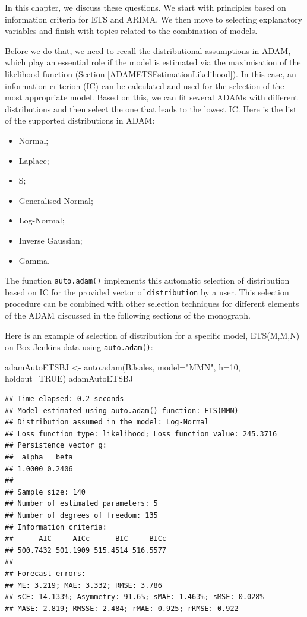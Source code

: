 \documentclass[
]{book}
\newenvironment{Shaded}{\begin{snugshade}}{\end{snugshade}}
\newcommand{\AttributeTok}[1]{\textcolor[rgb]{0.77,0.63,0.00}{#1}}
\newcommand{\ConstantTok}[1]{\textcolor[rgb]{0.00,0.00,0.00}{#1}}
\newcommand{\DecValTok}[1]{\textcolor[rgb]{0.00,0.00,0.81}{#1}}
\newcommand{\FunctionTok}[1]{\textcolor[rgb]{0.00,0.00,0.00}{#1}}
\newcommand{\NormalTok}[1]{#1}
\newcommand{\OtherTok}[1]{\textcolor[rgb]{0.56,0.35,0.01}{#1}}
\newcommand{\StringTok}[1]{\textcolor[rgb]{0.31,0.60,0.02}{#1}}
\providecommand{\tightlist}{%
  \setlength{\itemsep}{0pt}\setlength{\parskip}{0pt}}
\theoremstyle{definition}
\theoremstyle{definition}
\theoremstyle{definition}
\theoremstyle{definition}
\theoremstyle{remark}
\begin{document}
In this chapter, we discuss these questions. We start with principles based on information criteria \citep[addressed in Chapter 13 of][]{SvetunkovSBA} for ETS and ARIMA. We then move to selecting explanatory variables and finish with topics related to the combination of models.

Before we do that, we need to recall the distributional assumptions in ADAM, which play an essential role if the model is estimated via the maximisation of the likelihood function (Section \ref{ADAMETSEstimationLikelihood}). In this case, an information criterion (IC) can be calculated and used for the selection of the most appropriate model. Based on this, we can fit several ADAMs with different distributions and then select the one that leads to the lowest IC. Here is the list of the supported distributions in ADAM:

\begin{itemize}
\tightlist
\item
  Normal;
\item
  Laplace;
\item
  S;
\item
  Generalised Normal;
\item
  Log-Normal;
\item
  Inverse Gaussian;
\item
  Gamma.
\end{itemize}

The function \texttt{auto.adam()} implements this automatic selection of distribution based on IC for the provided vector of \texttt{distribution} by a user. This selection procedure can be combined with other selection techniques for different elements of the ADAM discussed in the following sections of the monograph.

Here is an example of selection of distribution for a specific model, ETS(M,M,N) on Box-Jenkins data using \texttt{auto.adam()}:

\begin{Shaded}
\begin{Highlighting}[]
\NormalTok{adamAutoETSBJ }\OtherTok{\textless{}{-}} \FunctionTok{auto.adam}\NormalTok{(BJsales, }\AttributeTok{model=}\StringTok{"MMN"}\NormalTok{, }\AttributeTok{h=}\DecValTok{10}\NormalTok{, }\AttributeTok{holdout=}\ConstantTok{TRUE}\NormalTok{)}
\NormalTok{adamAutoETSBJ}
\end{Highlighting}
\end{Shaded}

\begin{verbatim}
## Time elapsed: 0.2 seconds
## Model estimated using auto.adam() function: ETS(MMN)
## Distribution assumed in the model: Log-Normal
## Loss function type: likelihood; Loss function value: 245.3716
## Persistence vector g:
##  alpha   beta 
## 1.0000 0.2406 
## 
## Sample size: 140
## Number of estimated parameters: 5
## Number of degrees of freedom: 135
## Information criteria:
##      AIC     AICc      BIC     BICc 
## 500.7432 501.1909 515.4514 516.5577 
## 
## Forecast errors:
## ME: 3.219; MAE: 3.332; RMSE: 3.786
## sCE: 14.133%; Asymmetry: 91.6%; sMAE: 1.463%; sMSE: 0.028%
## MASE: 2.819; RMSSE: 2.484; rMAE: 0.925; rRMSE: 0.922
\end{verbatim}
\end{document}
